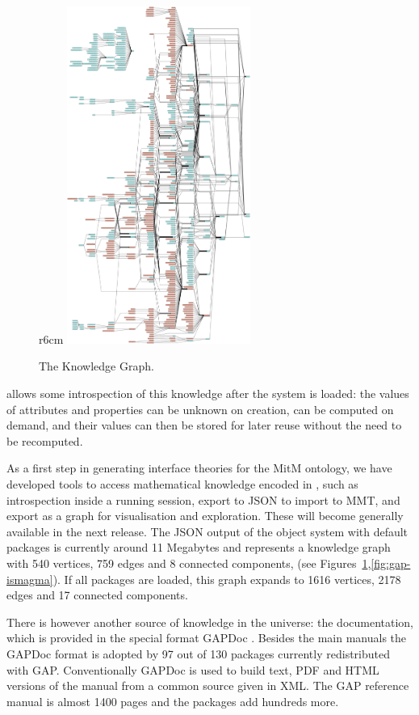 \begin{figure}r{6cm}\vspace*{-2em}
  \includegraphics[width=6cm]{gap-graph}\vspace*{-.5em}
  \caption{The \GAP Knowledge Graph.\label{fig:gap-graph}}\vspace*{-2em}
\end{figure}
\GAP allows some introspection of this knowledge after the system is loaded: the values of
attributes and properties can be unknown on creation, can be computed on demand, and their
values can then be stored for later reuse without the need to be recomputed.

As a first step in generating interface theories for the MitM ontology, we have developed
tools to access mathematical knowledge encoded in \GAP, such as introspection inside a
running \GAP session, export to JSON to import to MMT, and export as a graph for
visualisation and exploration. These will become generally available in the next \GAP
release. The JSON output of the \GAP object system with default packages is currently
around 11 Megabytes and represents a knowledge graph with 540 vertices, 759 edges and 8 connected
components, (see Figures~\ref{fig:gap-graph},\ref{fig:gap-ismagma}). If all
packages are loaded, this graph expands to 1616 vertices, 2178 edges and 17 connected
components.

There is however another source of knowledge in the \GAP universe: the documentation, which is
provided in the special format GAPDoc \cite{gapdoc}. Besides the main manuals the GAPDoc
format is adopted by 97 out of 130 packages currently redistributed with
GAP. Conventionally GAPDoc is used to build text, PDF and HTML versions of the manual
from a common source given in XML. The GAP reference manual is almost 1400 pages and the
packages add hundreds more.

